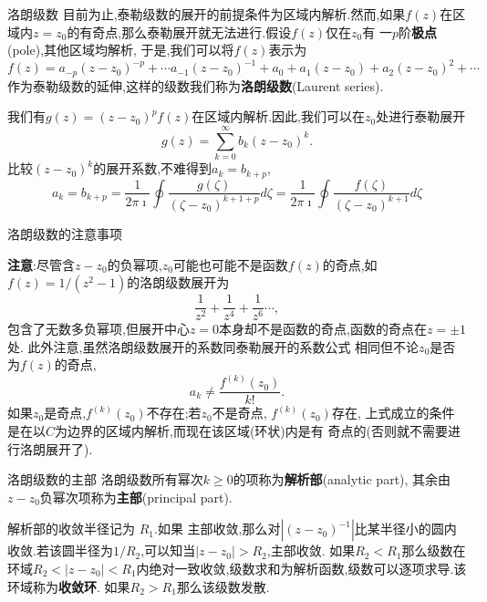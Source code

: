 \documentclass[fontset=windows, chinese, 10pt]{beamer}
\begin{document}
\begin{frame}{洛朗级数}
目前为止,泰勒级数的展开的前提条件为区域内解析.然而,如果$f(z)$在区域内$z=z_0$的有奇点,那么泰勒展开就无法进行.假设$f(z)$仅在$z_0$有
一$p$阶\textbf{极点}(pole),其他区域均解析,
于是,我们可以将$f(z)$表示为
\begin{equation}
    f(z) = a_{-p} (z-z_0)^{-p} + \cdots a_{-1}(z-z_0)^{-1} + a_0 + a_{1} (z-z_0) + a_{2} (z-z_0)^2 + \cdots 
\end{equation}
作为泰勒级数的延伸,这样的级数我们称为\textbf{洛朗级数}(Laurent series).

我们有$g(z) = (z-z_0)^p f(z)$在区域内解析.因此,我们可以在$z_0$处进行泰勒展开
\begin{equation}
    g(z) = \sum_{k=0}^{\infty} b_k (z-z_0)^{k} .
\end{equation}
比较$(z-z_0)^k$的展开系数,不难得到$a_k = b_{k+p}$,
\begin{equation}
    a_k = b_{k+p} = \frac{1}{2\pi \imath} \oint \frac{g(\zeta)}{(\zeta - z_0)^{k+1+p}} d\zeta 
    = \frac{1}{2\pi \imath} \oint \frac{f(\zeta)}{(\zeta - z_0)^{k+1}} d\zeta
\end{equation}

\end{frame}

\begin{frame}{洛朗级数的注意事项}

\textbf{注意}:尽管含$z-z_0$的负幂项,$z_0$可能也可能不是函数$f(z)$的奇点,如$f(z) = 1/(z^2-1)$的洛朗级数展开为
$$
\frac{1}{z^2} + \frac{1}{z^4} + \frac{1}{z^6}\cdots,
$$
包含了无数多负幂项,但展开中心$z=0$本身却不是函数的奇点,函数的奇点在$z=\pm 1$处. 此外注意,虽然洛朗级数展开的系数同泰勒展开的系数公式
相同但不论$z_0$是否为$f(z)$的奇点,
$$a_k \neq \frac{f^{(k)}(z_0)}{k!}.
$$
如果$z_0$是奇点,$f^{(k)}(z_0)$不存在;若$z_0$不是奇点, $f^{(k)}(z_0)$存在, 上式成立的条件是在以$C$为边界的区域内解析,而现在该区域(环状)内是有
奇点的(否则就不需要进行洛朗展开了).

\end{frame}

\begin{frame}{洛朗级数的主部}
  \small
洛朗级数所有幂次$k\geq 0$的项称为\textbf{解析部}(analytic part), 
其余由$z-z_0$负幂次项称为\textbf{主部}(principal part).

解析部的收敛半径记为
$R_1$.如果
主部收敛,那么对$|(z-z_0)^{-1}|$比某半径小的圆内收敛.若该圆半径为$1/R_2$,可以知当$|z-z_0|> R_2$,主部收敛.
如果$R_2 < R_1$那么级数在环域$R_2 < |z- z_0| < R_1$内绝对一致收敛,级数求和为解析函数,级数可以逐项求导.该环域称为\textbf{收敛环}.
如果$R_2 > R_1$那么该级数发散.
\end{frame}
\end{document}
